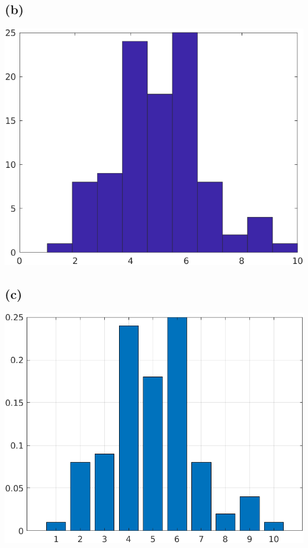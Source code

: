 \documentclass[a4paper]{scrartcl}
\begin{document}
\subsection*{(b)}

\begin{center}
	\includegraphics*[scale = 0.5]{question4b.png}
\end{center}

\subsection*{(c)}

\begin{center}
	\includegraphics*[scale = 0.5]{question4c.png}
\end{center}
\end{document}
